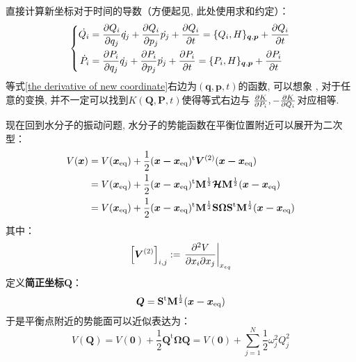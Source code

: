     直接计算新坐标对于时间的导数（方便起见, 此处使用求和约定）：
    \begin{equation}
        \left\{
            \begin{split}
                \dot{Q_i} &= \frac{\partial{Q_i}}{\partial{q_{j}}}\dot{q_{j}} + \frac{\partial{Q_i}}{\partial{p_j}}\dot{p_j}
                + \frac{\partial{Q_i}}{\partial{t}} = \{Q_i, H\}_{\bm{q},\bm{p}} + \frac{\partial{Q_i}}{\partial{t}}\\
                \dot{P_i} &= \frac{\partial{P_i}}{\partial{q_{j}}}\dot{q_{j}} + \frac{\partial{P_i}}{\partial{p_j}}\dot{p_j}
                + \frac{\partial{P_i}}{\partial{t}} = \{P_i, H\}_{\bm{q},\bm{p}} + \frac{\partial{P_i}}{\partial{t}}
            \end{split}
        \right.
        \label{the derivative of new coordinate}
    \end{equation}
    等式\ref{the derivative of new coordinate}右边为$(\bm{q},\bm{p},t)$的函数, 可以想象
    , 对于任意的变换, 并不一定可以找到$K(\bm{Q},\bm{P},t)$使得等式右边与
    $\frac{\partial{K}}{\partial{P_{i}}},-\frac{\partial{K}}{\partial{Q_i}}$对应相等.
    
    \splitline

    现在回到水分子的振动问题, 水分子的势能函数在平衡位置附近可以展开为二次型：
    \begin{equation}
        \begin{split}
        V(\bm{x}) &= V(\bm{x}_\mathrm{eq}) + \frac 12 (\bm{x-x}_\mathrm{eq})^\mathrm{t} \bm{V}^{(2)} (\bm{x-x}_\mathrm{eq})\\
        &= V(\bm{x}_\mathrm{eq}) + \frac 12 (\bm{x-x}_\mathrm{eq})^\mathrm{t} \mathbf{M}^{\frac 12}\bm{\mathcal{H}} \mathbf{M}^{\frac 12} (\bm{x-x}_\mathrm{eq})\\
        &= V(\bm{x}_\mathrm{eq}) + \frac 12 (\bm{x-x}_\mathrm{eq})^\mathrm{t} \mathbf{M}^{\frac 12} \mathbf{S}\bm{\Omega} \mathbf{S}^\mathrm{t} \mathbf{M}^{\frac 12} (\bm{x-x}_\mathrm{eq})
        \end{split}
    \end{equation}
    其中：
    \begin{equation}
        \left[\bm{V}^{(2)}\right]_{i,j} := \left.\frac{\partial{^2 V}}{\partial{x_i\partial x_j}}\right|_{x_{eq}}
    \end{equation}
    定义\textbf{简正坐标}$\bm{Q}$：
    \begin{equation}
        \bm{Q} = \mathbf{S}^\mathrm{t} \mathbf{M}^{\frac 12} (\bm{x-x}_\mathrm{eq})
    \end{equation}
    于是平衡点附近的势能面可以近似表达为：
    \begin{equation}
        V(\bm{Q}) = V(\bm{0}) + \frac 12 \bm{Q}^\mathrm{t} \bm{\Omega Q} = V(\bm{0}) + \sum_{j=1}^N \frac 12 \omega_j^2 Q_j^2
    \end{equation}


